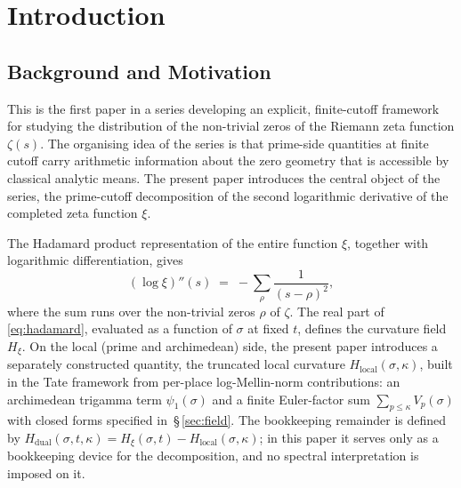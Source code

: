 \documentclass[11pt]{article}
\newcommand{\Hxi}{H_{\xi}}
\newcommand{\Hlocal}{H_{\mathrm{local}}}
\newcommand{\Hdual}{H_{\mathrm{dual}}}
\begin{document}
\newpage

\section{Introduction}
\label{sec:intro}

\subsection{Background and Motivation}
\label{sec:bg}

This is the first paper in a series developing an explicit,
finite-cutoff framework for studying the distribution of the
non-trivial zeros of the Riemann zeta function $\zeta(s)$.
The organising idea of the series is that prime-side
quantities at finite cutoff carry arithmetic information
about the zero geometry that is accessible by classical
analytic means.
The present paper introduces the central object of the
series, the prime-cutoff decomposition of the second
logarithmic derivative of the completed zeta function $\xi$.

The Hadamard product representation of the entire function
$\xi$, together with logarithmic differentiation, gives
\begin{equation}\label{eq:hadamard}
(\log\xi)''(s)
\;=\;-\sum_{\rho}\frac{1}{(s-\rho)^{2}},
\end{equation}
where the sum runs over the non-trivial zeros $\rho$ of
$\zeta$.
The real part of \eqref{eq:hadamard}, evaluated as a function
of $\sigma$ at fixed $t$, defines the curvature field $\Hxi$.
On the local (prime and archimedean) side, the present paper
introduces a separately constructed quantity, the truncated
local curvature $\Hlocal(\sigma,\kappa)$, built in the Tate
framework from per-place log-Mellin-norm contributions: an
archimedean trigamma term $\psi_1(\sigma)$ and a finite
Euler-factor sum $\sum_{p\le\kappa}V_p(\sigma)$ with closed
forms specified in~\S\,\ref{sec:field}.
The bookkeeping remainder is defined by
$\Hdual(\sigma,t,\kappa)=\Hxi(\sigma,t)-\Hlocal(\sigma,\kappa)$;
in this paper it serves only as a bookkeeping device for the
decomposition, and no spectral interpretation is imposed on
it.
\end{document}
